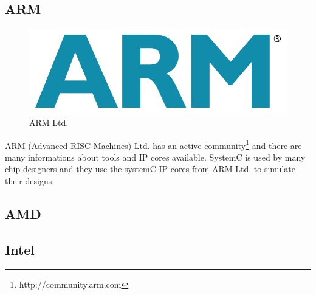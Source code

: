 \documentclass{article}
\begin{document}
	\subsection{ARM}
	    \begin{figure}[hp]
	      \centering
	      \includegraphics[scale=0.18]{../pictures/armlogo.jpg}
	      \caption{ARM Ltd.}
	      \label{fig:arm}
	    \end{figure}  
	    ARM (Advanced RISC Machines) Ltd. has an active community\footnote{http://community.arm.com} and there are many informations about tools and IP cores available.
	    SystemC is used by many chip designers and they use the systemC-IP-cores from ARM Ltd. to simulate their designs.
	  \subsection{AMD}
	  
	  \subsection{Intel}
	  
\end{document}
